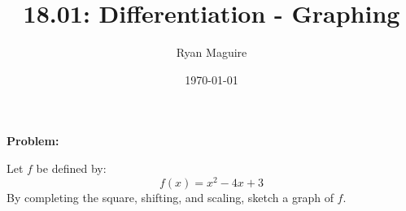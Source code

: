\documentclass{article}
\title{18.01: Differentiation - Graphing}
\author{Ryan Maguire}
\date{\today}
\newif\ifsolution
\begin{document}
    \maketitle
    \textbf{Problem:}
    \par\hfill\par
    Let $f$ be defined by:
    \[
        f(x)=x^{2}-4x+3
    \]
    By completing the square, shifting, and scaling, sketch a graph of
    $f$.
    \par\hfill\par
    \ifsolution
        \color{blue}
        \textbf{Solution:}
        \par\hfill\par
        We can factor $f$ directly, obtaining:
        \[
            f(x)=(x-3)(x-1)
        \]
        which tells us the roots of $f$ are $x=1$ and $x=3$. Let's complete
        the square. We have:
        \[
            x^{2}-4x=(x-2)^{2}-4
        \]
        And hence:
        \[
            f(x)=x^{2}-4x+3=(x-2)^{2}-1
        \]
        We know what the graph of $y=x^{2}$ looks like, it is an ordinary
        parabola. This final formula tells us we are shifting this familiar
        image vertically \textit{downwards} by 1 and horizontally to the
        \textit{right} by 2. This creates the image below.
        \begin{figure}
            \centering
            \texttt{[image: completing\_the\_square\_and\_graphing\_001]}
            \caption{Graph of $f$}
        \end{figure}
    \fi
\end{document}
